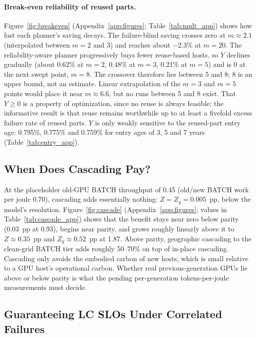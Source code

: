 \documentclass{article} %
\begin{document}
\paragraph{Break-even reliability of reused parts.} Figure~\ref{fig:breakeven} (Appendix~\ref{app:figures}; Table~\ref{tab:mult_app}) shows how fast each planner's saving decays. The failure-blind saving crosses zero at $m\approx 2.1$ (interpolated between $m=2$ and 3) and reaches about $-2.3\%$ at $m=20$. The reliability-aware planner progressively buys fewer reuse-based hosts, so $Y$ declines gradually (about 0.62\% at $m=2$, 0.48\% at $m=3$, 0.21\% at $m=5$) and is 0 at the next swept point, $m=8$. The crossover therefore lies between 5 and 8; 8 is an upper bound, not an estimate. Linear extrapolation of the $m=3$ and $m=5$ points would place it near $m\approx 6.6$, but no runs between 5 and 8 exist. That $Y\ge 0$ is a property of optimization, since no reuse is always feasible; the informative result is that reuse remains worthwhile up to at least a fivefold excess failure rate of reused parts. $Y$ is only weakly sensitive to the reused-part entry age: 0.795\%, 0.775\% and 0.759\% for entry ages of 3, 5 and 7 years (Table~\ref{tab:entry_app}).

\subsection{When Does Cascading Pay?}
\label{sec:cascade}
At the placeholder old-GPU BATCH throughput of 0.45 (old/new BATCH work per joule 0.70), cascading adds essentially nothing: $Z = Z_g = 0.005$~pp, below the model's resolution. Figure~\ref{fig:cascade} (Appendix~\ref{app:figures}; values in Table~\ref{tab:cascade_app}) shows that the benefit stays near zero below parity (0.03~pp at 0.93), begins near parity, and grows roughly linearly above it to $Z \approx 0.35$~pp and $Z_g \approx 0.52$~pp at 1.87. Above parity, geographic cascading to the clean-grid BATCH tier adds roughly 50--70\% on top of in-place cascading. Cascading only avoids the embodied carbon of new hosts, which is small relative to a GPU host's operational carbon. Whether real previous-generation GPUs lie above or below parity is what the pending per-generation tokens-per-joule measurements must decide.

\subsection{Guaranteeing LC SLOs Under Correlated Failures}
\label{sec:slo}
\end{document}
